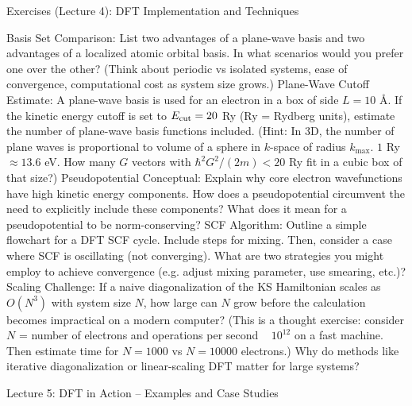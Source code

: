 Exercises (Lecture 4): DFT Implementation and Techniques

Basis Set Comparison: List two advantages of a plane-wave basis and two advantages of a localized atomic orbital basis. In what scenarios would you prefer one over the other? (Think about periodic vs isolated systems, ease of convergence, computational cost as system size grows.)
Plane-Wave Cutoff Estimate: A plane-wave basis is used for an electron in a box of side $L=10$ Å. If the kinetic energy cutoff is set to $E_{\rm cut} = 20$ Ry (Ry = Rydberg units), estimate the number of plane-wave basis functions included. (Hint: In 3D, the number of plane waves is proportional to volume of a sphere in $k$-space of radius $k_{\max}$. $1$ Ry $\approx 13.6$ eV. How many $G$ vectors with $\hbar^2 G^2/(2m) < 20$ Ry fit in a cubic box of that size?)
Pseudopotential Conceptual: Explain why core electron wavefunctions have high kinetic energy components. How does a pseudopotential circumvent the need to explicitly include these components? What does it mean for a pseudopotential to be norm-conserving?
SCF Algorithm: Outline a simple flowchart for a DFT SCF cycle. Include steps for mixing. Then, consider a case where SCF is oscillating (not converging). What are two strategies you might employ to achieve convergence (e.g. adjust mixing parameter, use smearing, etc.)?
Scaling Challenge: If a naive diagonalization of the KS Hamiltonian scales as $O(N^3)$ with system size $N$, how large can $N$ grow before the calculation becomes impractical on a modern computer? (This is a thought exercise: consider $N$ = number of electrons and operations per second ~ $10^{12}$ on a fast machine. Then estimate time for $N=1000$ vs $N=10000$ electrons.) Why do methods like iterative diagonalization or linear-scaling DFT matter for large systems?





Lecture 5: DFT in Action – Examples and Case Studies


